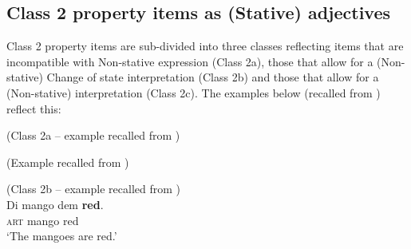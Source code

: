 \subsection{Class 2 property items as (Stative) adjectives}\label{sec:6.1.2}

Class 2 property items are sub-divided into three classes reflecting items that are incompatible with Non-stative expression (Class 2a), those that allow for a (Non-stative) Change of state interpretation (Class 2b) and those that allow for a (Non-stative)  interpretation (Class 2c). The examples below (recalled from ) reflect this:

\ea%
 \label{ex:6:5}
 (Class 2a -- example  recalled from )\\
 


\z
\z

\ea%
 \label{ex:6:6}
(Example  recalled from )\\


\z
\z

\ea%
 \label{ex:6:7}
 (Class 2b -- example  recalled from )\\
\ea
\gll    Di mango     dem \textbf{red}.\\
\textsc{art} mango {\PL}         red\\
\glt `The mangoes are red.'


